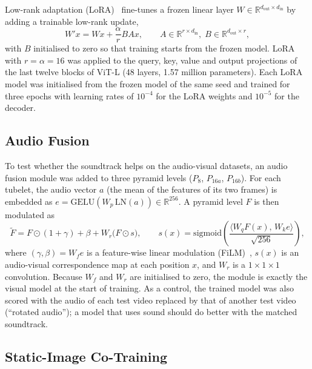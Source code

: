 Low-rank adaptation (\acrshort{LoRA})~\cite{hu2022lora} fine-tunes a frozen linear layer
$W\in\mathbb{R}^{d_{\mathrm{out}}\times d_{\mathrm{in}}}$ by adding a trainable
low-rank update,
\begin{equation}
  W'x = Wx + \frac{\alpha}{r}BAx, \qquad A\in\mathbb{R}^{r\times d_{\mathrm{in}}},\;
  B\in\mathbb{R}^{d_{\mathrm{out}}\times r},
  \label{eq:lora}
\end{equation}
with $B$ initialised to zero so that training starts from the frozen model.
\acrshort{LoRA} with $r=\alpha=16$ was applied to the query, key, value and output
projections of the last twelve blocks of \acrshort{ViT}-L (48 layers, 1.57 million
parameters). Each \acrshort{LoRA} model was initialised from the frozen model of the same
seed and trained for three epochs with learning rates of $10^{-4}$ for the
\acrshort{LoRA} weights and $10^{-5}$ for the decoder.

\subsection{Audio Fusion}\label{sec:audio-fusion}

To test whether the soundtrack helps on the audio-visual datasets, an audio
fusion module was added to three pyramid levels ($P_8$, $P_{16a}$,
$P_{16b}$). For each tubelet, the audio vector $a$ (the mean of the features of
its two frames) is embedded as $e=\mathrm{GELU}(W_p\,\mathrm{LN}(a))\in\mathbb{R}^{256}$.
A pyramid level $F$ is then modulated as
\begin{equation}
  \tilde F = F\odot(1+\gamma) + \beta + W_r\big(F\odot s\big), \qquad
  s(x)=\mathrm{sigmoid}\!\left(\frac{\langle W_q F(x),\,W_k e\rangle}{\sqrt{256}}\right),
  \label{eq:audio}
\end{equation}
where $(\gamma,\beta)=W_f e$ is a feature-wise linear modulation
(\acrshort{FiLM})~\cite{perez2018film}, $s(x)$ is an audio-visual correspondence map at
each position $x$, and $W_r$ is a $1\times1\times1$ convolution. Because $W_f$
and $W_r$ are initialised to zero, the module is exactly the visual model at
the start of training. As a control, the trained model was also scored with
the audio of each test video replaced by that of another test video
(\enquote{rotated audio}); a model that uses sound should do better with the
matched soundtrack.

\subsection{Static-Image Co-Training}\label{sec:static}

